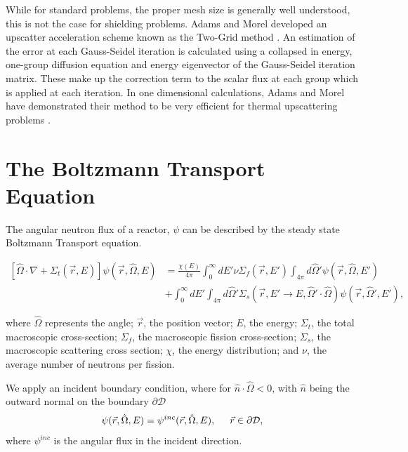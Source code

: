 \par
While for standard problems, the proper mesh size is generally well understood, this is not the case for shielding problems. Adams and Morel developed an upscatter acceleration scheme known as the Two-Grid method \cite{morel-upscat}. An estimation of the error at each Gauss-Seidel iteration is calculated using a collapsed in energy, one-group diffusion equation and energy eigenvector of the Gauss-Seidel iteration matrix. These make up the correction term to the scalar flux at each group which is applied at each iteration. In one dimensional calculations, Adams and Morel have demonstrated their method to be very efficient for thermal upscattering problems \cite{morel-upscat}.

\section{The Boltzmann Transport Equation}
The angular neutron flux of a reactor, $\psi$ can be described by the steady state Boltzmann Transport equation.

\begin{equation}
\begin{split}
 [\hat{\Omega} \cdot \nabla + \Sigma_t(\vec{r}, E)]\psi(\vec{r}, \hat{\Omega}, E) &= \frac{\chi(E)}{4\pi} \int_0^\infty dE' \nu \Sigma_{f}(\vec{r}, E') \int_{4\pi} d\hat{\Omega}'\psi(\vec{r}, \hat{\Omega}, E') \\   &+ \int_0^\infty dE' \int_{4\pi} d\hat{\Omega}' \Sigma_s(\vec{r}, E' \rightarrow E, \hat{\Omega}' \cdot \hat{\Omega})\psi(\vec{r}, \hat{\Omega}', E'), 
\end{split}
\label{eq:transport}
\end{equation}


where $\hat{\Omega}$ represents the angle; $\vec{r}$, the position vector; $E$, the energy; $\Sigma_t$, the total macroscopic cross-section; $\Sigma_f$, the macroscopic fission cross-section; $\Sigma_s$, the macroscopic scattering cross section; $\chi$, the energy distribution; and $\nu$, the average number of neutrons per fission. 

We apply an incident boundary condition, where for $\hat{n} \cdot \hat{\Omega} < 0$, with $\hat{n}$ being the outward normal on the boundary $\partial \mathcal{D}$
\begin{equation}
    \psi(\vec{r}, \hat{\Omega}, E) = \psi^{inc}(\vec{r}, \hat{\Omega}, E), \hspace{5mm} \vec{r} \in \partial \mathcal{D}, 
\end{equation}
where $\psi^{inc}$ is the angular flux in the incident direction. 

